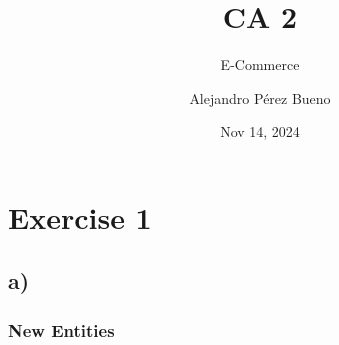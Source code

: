 \documentclass[
]{report}
\title{CA 2}
\subtitle{E-Commerce}
\author{Alejandro Pérez Bueno}
\date{Nov 14, 2024}
\renewcommand*\contentsname{Table of contents}
\newcommand\contentsname{Table of contents}
\begin{document}
\maketitle

\renewcommand*\contentsname{Table of Contents}
{
\hypersetup{linkcolor=}
\setcounter{tocdepth}{2}
\tableofcontents
}

\newpage{}

\section{Exercise 1}\label{exercise-1}

\subsection{a)}\label{a}

\subsubsection{\texorpdfstring{\textbf{New
Entities}}{New Entities}}\label{new-entities}
\end{document}
